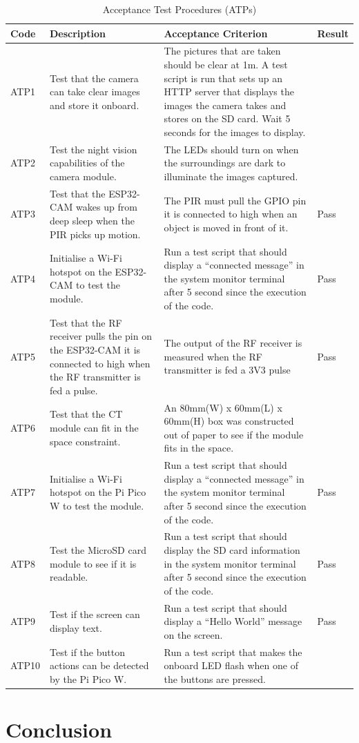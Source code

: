 \documentclass[class=report,11pt,crop=false]{standalone}
\begin{document}
\begin{table}[ht]
\centering
\begin{tabular}{|p{1cm}|p{5cm}|p{7cm}|p{2cm}|}
\hline
\textbf{Code} & \textbf{Description} & \textbf{Acceptance Criterion} & \textbf{Result} \\
\hline
ATP1 & Test that the camera can take clear images and store it onboard. & The pictures that are taken should be clear at 1m. A test script is run that sets up an HTTP server that displays the images the camera takes and stores on the SD card. Wait 5 seconds for the images to display. &  \\
\hline
ATP2 & Test the night vision capabilities of the camera module. & The LEDs should turn on when the surroundings are dark to illuminate the images captured. &  \\
\hline
ATP3 & Test that the ESP32-CAM wakes up from deep sleep when the PIR picks up motion. & The PIR must pull the GPIO pin it is connected to high when an object is moved in front of it. & Pass \\
\hline
ATP4 & Initialise a Wi-Fi hotspot on the ESP32-CAM to test the module. & Run a test script that should display a “connected message” in the system monitor terminal after 5 second since the execution of the code. & Pass \\
\hline
ATP5 & Test that the RF receiver pulls the pin on the ESP32-CAM it is connected to high when the RF transmitter is fed a pulse. & The output of the RF receiver is measured when the RF transmitter is fed a 3V3 pulse & Pass \\
\hline
ATP6 & Test that the CT module can fit in the space constraint. & An 80mm(W) x 60mm(L) x 60mm(H) box was constructed out of paper to see if the module fits in the space. &  \\
\hline
ATP7 & Initialise a Wi-Fi hotspot on the Pi Pico W to test the module. & Run a test script that should display a “connected message” in the system monitor terminal after 5 second since the execution of the code. & Pass \\
\hline
ATP8 & Test the MicroSD card module to see if it is readable. & Run a test script that should display the SD card information in the system monitor terminal after 5 second since the execution of the code. & Pass \\
\hline
ATP9 & Test if the screen can display text. & Run a test script that should display a “Hello World” message on the screen. & Pass \\
\hline
ATP10 & Test if the button actions can be detected by the Pi Pico W. & Run a test script that makes the onboard LED flash when one of the buttons are pressed. &  \\
\hline
\end{tabular}
\caption{Acceptance Test Procedures (ATPs)}
\label{tab:ATPs}
\end{table}



\section{Conclusion}


\ifstandalone

\printnoidxglossary[type=\acronymtype,nonumberlist]
\fi
\end{document}
